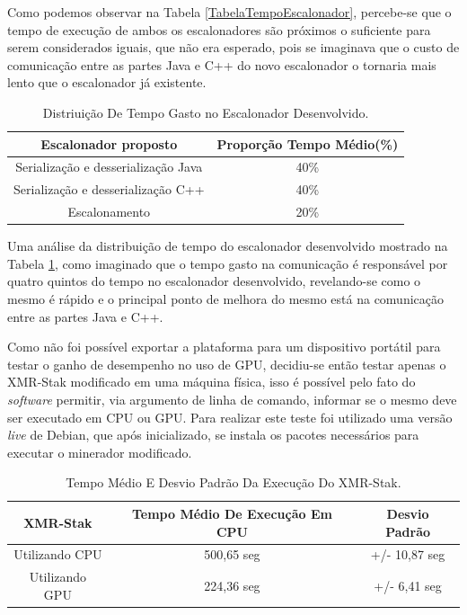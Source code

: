 Como podemos observar na Tabela \ref{TabelaTempoEscalonador}, percebe-se que o tempo de execução de ambos os escalonadores são próximos o suficiente para serem considerados iguais, que não era esperado, pois se imaginava que o custo de comunicação entre as partes Java e C++ do novo escalonador o tornaria mais lento que o escalonador já existente.

\begin {table}[H]
\begin{center}
	\begin{tabular}{ |c|c| } 
		\hline
		Escalonador proposto & Proporção Tempo Médio(\%) \\ 
		\hline
		Serialização e desserialização Java & 40\% \\ 
		\hline
		Serialização e desserialização C++ & 40\% \\ 
		\hline
		Escalonamento & 20\% \\ 
		\hline
	\end{tabular}
\caption {Distriuição De Tempo Gasto no Escalonador Desenvolvido.} \label{TabelaProporcaoEscalonador} 
\end{center}
\end {table}

Uma análise da distribuição de tempo do escalonador desenvolvido mostrado na Tabela \ref{TabelaProporcaoEscalonador}, como imaginado que o tempo gasto na comunicação é responsável por quatro quintos do tempo no escalonador desenvolvido, revelando-se como o mesmo é rápido e o principal ponto de melhora do mesmo está na comunicação entre as partes Java e C++.

Como não foi possível exportar a plataforma para um dispositivo portátil para testar o ganho de desempenho no uso de \acrshort{GPU}, decidiu-se então testar apenas o XMR-Stak modificado em uma máquina física, isso é possível pelo fato do \textit{software} permitir, via argumento de linha de comando, informar se o mesmo deve ser executado em \acrshort{CPU} ou \acrshort{GPU}. Para realizar este teste foi utilizado uma versão \textit{live} de Debian, que após inicializado, se instala os pacotes necessários para executar o minerador modificado.

\begin {table}[H]
\begin{center}
	\begin{tabular}{ |c|c|c| } 
		\hline
		XMR-Stak & Tempo Médio De Execução Em \acrshort{CPU} & Desvio Padrão \\ 
		\hline
		Utilizando \acrshort{CPU} & 500,65 seg & +/- 10,87 seg\\ 
		\hline
		Utilizando \acrshort{GPU} & 224,36 seg & +/- 6,41 seg \\ 
		\hline
	\end{tabular}
\caption {Tempo Médio E Desvio Padrão Da Execução Do XMR-Stak.} \label{TabelaTempoCPU} 
\end{center}
\end {table}


